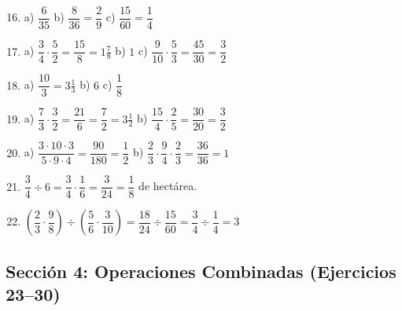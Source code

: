 \documentclass[12pt, letterpaper]{article}
\begin{document}
  \begin{enumerate}[leftmargin=*, label=\textbf{\arabic*.}]
    \setcounter{enumi}{15}
    \item a) $\dfrac{6}{35}$ \quad b) $\dfrac{8}{36} = \dfrac{2}{9}$ \quad c) $\dfrac{15}{60} = \dfrac{1}{4}$

    \item a) $\dfrac{3}{4} \cdot \dfrac{5}{2} = \dfrac{15}{8} = 1\frac{7}{8}$ \quad b) $1$ \quad c) $\dfrac{9}{10} \cdot \dfrac{5}{3} = \dfrac{45}{30} = \dfrac{3}{2}$

    \item a) $\dfrac{10}{3} = 3\frac{1}{3}$ \quad b) $6$ \quad c) $\dfrac{1}{8}$

    \item a) $\dfrac{7}{3} \cdot \dfrac{3}{2} = \dfrac{21}{6} = \dfrac{7}{2} = 3\frac{1}{2}$ \quad b) $\dfrac{15}{4} \cdot \dfrac{2}{5} = \dfrac{30}{20} = \dfrac{3}{2}$

    \item a) $\dfrac{3 \cdot 10 \cdot 3}{5 \cdot 9 \cdot 4} = \dfrac{90}{180} = \dfrac{1}{2}$ \quad b) $\dfrac{2}{3} \cdot \dfrac{9}{4} \cdot \dfrac{2}{3} = \dfrac{36}{36} = 1$

    \item $\dfrac{3}{4} \div 6 = \dfrac{3}{4} \cdot \dfrac{1}{6} = \dfrac{3}{24} = \dfrac{1}{8}$ de hectárea.

    \item $\left(\dfrac{2}{3} \cdot \dfrac{9}{8}\right) \div \left(\dfrac{5}{6} \cdot \dfrac{3}{10}\right) = \dfrac{18}{24} \div \dfrac{15}{60} = \dfrac{3}{4} \div \dfrac{1}{4} = 3$
  \end{enumerate}

  \newpage

  \subsection*{Sección 4: Operaciones Combinadas (Ejercicios 23--30)}
\end{document}
